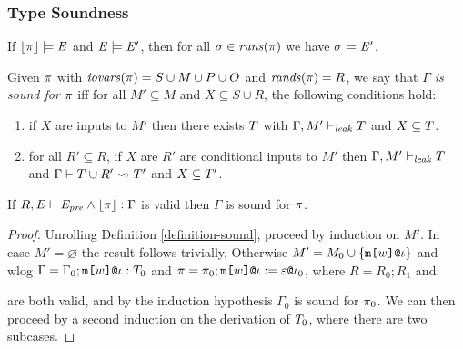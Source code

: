 \subsubsection{Type Soundness}


\begin{lemma}
  \label{lemma-eqsprogsound}
  If $\toeq{\prog} \models \eqs$ and $\eqs \models \eqs'$, then
  for all $\store \in \runs(\prog)$ we have $\store \models \eqs'$.
\end{lemma}

\begin{definition}
  \label{definition-sound}
  Given $\prog$ with $\iov(\prog) = S \cup M \cup P \cup O$
  and $\flips(\prog) = R$, we say that
  \emph{$\Gamma$ is sound for $\prog$} iff for all $M' \subseteq M$
      and $X \subseteq S \cup R$, the following
      conditions hold:
  \begin{enumerate}[\hspace{5mm}i.]
    \item  if $X$ are inputs to $M'$ then
      there exists $\ty$ with $\leakj{\Gamma}{M'}{\ty}$ and $X \subseteq \ty$.
    \item  for all  $R' \subseteq R$, if
      $X$ are $R'$ are conditional inputs to $M'$ then $\leakj{\Gamma}{M'}{\ty}$
      and $\leakclose{\Gamma}{\ty \cup R'}{\ty'}$ and $X \subseteq \ty'$.
  \end{enumerate}
\end{definition}

\begin{lemma}
  \label{lemma-cpjsound}
  If $\cpj{R}{\eqs}{\eqspre \wedge \toeq{\prog}}{\Gamma}$ is valid then $\Gamma$ is
  sound for $\prog$.
\end{lemma}
\begin{proof}
  Unrolling Definition \ref{definition-sound}, proceed by induction on $M'$.
  In case $M' = \varnothing$ the result follows trivially. Otherwise
  $M' = M_0 \cup \{ \mx{w}{\cid} \}$ and wlog $\Gamma = \Gamma_0; \mx{w}{\cid} : \ty_0$
  and $\prog = \prog_0;\xassign{\mx{w}{\cid}}{\be}{\cid_0}$, where $R = R_0;R_1$ and:
  \begin{mathpar}

  \end{mathpar}
  are both valid, and by the induction hypothesis $\Gamma_0$ is sound for $\prog_0$.
  We can then proceed by a second induction on the derivation of $\ty_0$, where there
  are two subcases. 
\end{proof}

